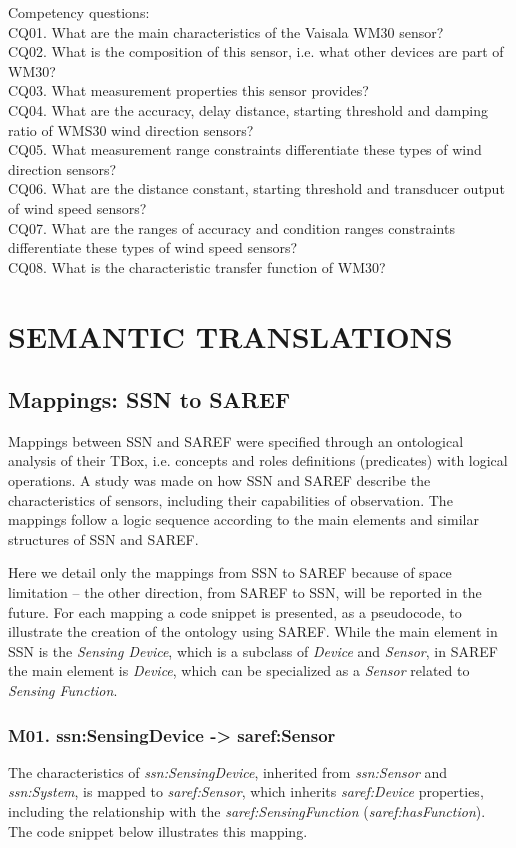 \documentclass{sig-alternate-05-2015}
\begin{document}
Competency questions: 
\\CQ01. What are the main characteristics of the Vaisala WM30 sensor? 
\\CQ02. What is the composition of this sensor, i.e. what other devices are part of WM30?
\\CQ03. What measurement properties this sensor provides?
\\CQ04. What are the accuracy, delay distance, starting threshold and damping ratio of WMS30 wind direction sensors? \\CQ05. What measurement range constraints differentiate these types of wind direction sensors?
\\CQ06. What are the distance constant, starting threshold and transducer output of wind speed sensors? 
\\CQ07. What are the ranges of accuracy and condition ranges  constraints differentiate these types of wind speed sensors?
\\CQ08. What is the characteristic transfer function of WM30?

\section{SEMANTIC TRANSLATIONS}

\subsection{Mappings: SSN to SAREF}
Mappings between SSN and SAREF were specified through an ontological analysis of their TBox, i.e. concepts and roles definitions (predicates) with logical operations. A study was made on how SSN and SAREF describe the characteristics of sensors, including their capabilities of observation. The mappings follow a logic sequence according to the main elements and similar structures of SSN and SAREF. 

Here we detail only the mappings from SSN to SAREF because of space limitation – the other direction, from SAREF to SSN, will be reported in the future. For each mapping a code snippet is presented, as a pseudocode, to illustrate the creation of the ontology using SAREF. While the main element in SSN is the \textit{Sensing Device}, which is a subclass of \textit{Device} and \textit{Sensor}, in SAREF the main element is \textit{Device}, which can be specialized as a \textit{Sensor} related to \textit{Sensing Function}. 

\subsubsection{M01. ssn:SensingDevice -> saref:Sensor}
The characteristics of \textit{ssn:SensingDevice}, inherited from \textit{ssn:Sensor} and \textit{ssn:System}, is mapped to \textit{saref:Sensor}, which inherits \textit{saref:Device} properties, including the relationship with the \textit{saref:SensingFunction} (\textit{saref:hasFunction}). The code snippet below illustrates this mapping. 
\end{document}
